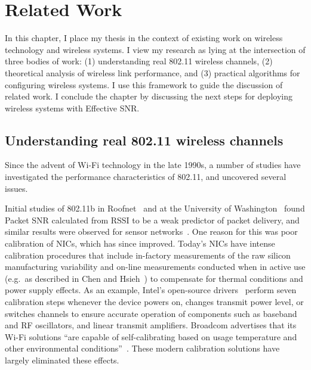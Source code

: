 \ifx\mainfile\undefined

\setcounter{chapter}{8} %
\fi

\cleardoublepage
\chapter{Related Work}
\label{chap:related}

In this chapter, I place my thesis in the context of existing work on wireless technology and wireless systems. I view my research as lying at the intersection of three bodies of work: (1) understanding real 802.11 wireless channels, (2) theoretical analysis of wireless link performance, and (3) practical algorithms for configuring wireless systems. I use this framework to guide the discussion of related work. I conclude the chapter by discussing the next steps for deploying wireless systems with Effective SNR.

\section{Understanding real 802.11 wireless channels}
Since the advent of Wi-Fi technology in the late 1990s, a number of studies have investigated the performance characteristics of 802.11, and uncovered several issues.

Initial studies of 802.11b in Roofnet~\cite{Aguayo_Roofnet} and at the University of Washington~\cite{Reis_interference} found Packet SNR calculated from RSSI to be a weak predictor of packet delivery, and similar results were observed for sensor networks~\cite{Zhao_sensys03}. One reason for this was poor calibration of NICs, which has since improved. Today's NICs have intense calibration procedures that include in-factory measurements of the raw silicon manufacturing variability and on-line measurements conducted when in active use (e.g.\ as described in Chen and Hsieh~\cite{Chen_IQcalib}) to compensate for thermal conditions and power supply effects. As an example, Intel's open-source drivers~\cite{iwlwifi} perform seven calibration steps whenever the device powers on, changes transmit power level, or switches channels to ensure accurate operation of components such as baseband and RF oscillators, and linear transmit amplifiers. Broadcom advertises that its Wi-Fi solutions ``are capable of self-calibrating based on usage temperature and other environmental conditions''~\cite{Broadcom_calib}. These modern calibration solutions have largely eliminated these effects.

